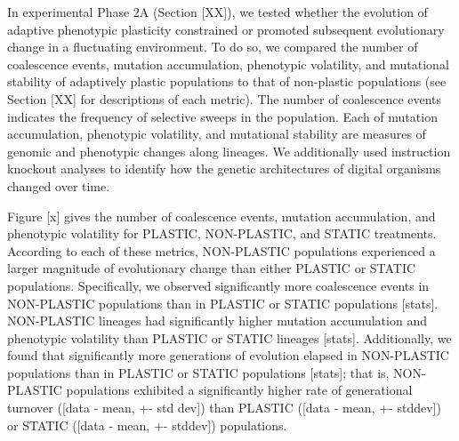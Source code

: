 

In experimental Phase 2A (Section [XX]),
we tested whether the evolution of adaptive phenotypic plasticity constrained or promoted subsequent evolutionary change in a fluctuating environment. 
To do so, we compared the number of coalescence events, mutation accumulation, phenotypic volatility, and mutational stability of adaptively plastic populations to that of non-plastic populations (see Section [XX] for descriptions of each metric).
The number of coalescence events indicates the frequency of selective sweeps in the population.
Each of mutation accumulation, phenotypic volatility, and mutational stability are measures of genomic and phenotypic changes along lineages.
We additionally used instruction knockout analyses to identify how the genetic architectures of digital organisms changed over time. 

Figure [x] gives the number of coalescence events, mutation accumulation, and phenotypic volatility for PLASTIC, NON-PLASTIC, and STATIC treatments.
According to each of these metrics, NON-PLASTIC populations experienced a larger magnitude of evolutionary change than either PLASTIC or STATIC populations.
Specifically, we observed significantly more coalescence events in NON-PLASTIC populations than in PLASTIC or STATIC populations [stats].
NON-PLASTIC lineages had significantly higher mutation accumulation and phenotypic volatility than PLASTIC or STATIC lineages [stats].
Additionally, we found that significantly more generations of evolution elapsed in NON-PLASTIC populations than in PLASTIC or STATIC populations [stats]; that is, NON-PLASTIC populations exhibited a significantly higher rate of generational turnover ([data - mean, +- std dev]) than PLASTIC ([data - mean, +- stddev]) or STATIC ([data - mean, +- stddev]) populations.

